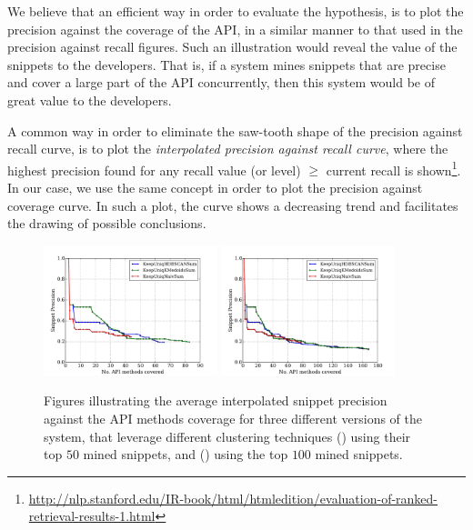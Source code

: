 We believe that an efficient way in order to evaluate the hypothesis, is to plot the precision against the coverage of the API, in a similar manner to that used in the precision against recall figures. Such an illustration would reveal the value of the snippets to the developers. That is, if a system mines snippets that are precise and cover a large part of the API concurrently, then this system would be of great value to the developers.

A common way in order to eliminate the saw-tooth shape of the precision against recall curve, is to plot the \textit{interpolated precision against recall curve}, where the highest precision found for any recall value (or level) $\geq$ current recall is shown\footnote{\url{http://nlp.stanford.edu/IR-book/html/htmledition/evaluation-of-ranked-retrieval-results-1.html}}. In our case, we use the same concept in order to plot the precision against coverage curve. In such a plot, the curve shows a decreasing trend and facilitates the drawing of possible conclusions.

\begin{figure}
\ffigbox
{%
  \begin{subfloatrow}[2]
  \ffigbox[\FBwidth]
    {\caption{}\label{res:exp4-interp-prec-cov50}}
    {\includegraphics[width=0.45\textwidth]{results/exp4-interp-prec-cov50.pdf}}
  \hspace{1em}%
  \ffigbox[\FBwidth]
    {\caption{}\label{res:exp4-interp-prec-cov100}}
    {\includegraphics[width=0.45\textwidth]{results/exp4-interp-prec-cov100.pdf}}
  \end{subfloatrow}}
  {\caption[Illustration of the average interpolated precision against coverage\protect\\($KeepUniqNaiveSum$, $KeepUniqKMedoidsSum$,\protect\\$KeepUniqHDBSCANSum$)]{Figures illustrating the average interpolated snippet precision against the API methods coverage for three different versions of the system, that leverage different clustering techniques () using their top $50$ mined snippets, and () using the top $100$ mined snippets.}
\label{res:exp4-interp-prec-cov}}
\end{figure}

